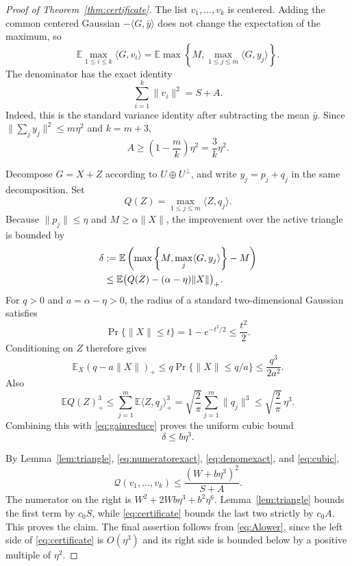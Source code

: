 \documentclass[11pt]{article}
\newcommand{\E}{\mathbb E}
\newcommand{\Q}{\mathcal Q}
\begin{document}
\begin{proof}[Proof of Theorem~\ref{thm:certificate}]
The list $v_1,\ldots,v_k$ is centered. Adding the common centered Gaussian
$-\langle G,\bar y\rangle$ does not change the expectation of the maximum,
so
\begin{equation}\label{eq:numeratorexact}
 \E\max_{1\le i\le k}\langle G,v_i\rangle
 =\E\max\left\{M,\max_{1\le j\le m}\langle G,y_j\rangle\right\}.
\end{equation}
The denominator has the exact identity
\begin{equation}\label{eq:denomexact}
 \sum_{i=1}^k\|v_i\|^2=S+A.
\end{equation}
Indeed, this is the standard variance identity after subtracting the mean
$\bar y$. Since $\|\sum_jy_j\|^2\le m\eta^2$ and $k=m+3$,
\begin{equation}\label{eq:Alower}
 A\ge\left(1-\frac{m}{k}\right)\eta^2=\frac3k\eta^2.
\end{equation}

Decompose $G=X+Z$ according to $U\oplus U^\perp$, and write
$y_j=p_j+q_j$ in the same decomposition. Set
\[
 Q(Z)=\max_{1\le j\le m}\langle Z,q_j\rangle.
\]
Because $\|p_j\|\le\eta$ and $M\ge\alpha\|X\|$, the improvement over the
active triangle is bounded by
\begin{align}
 \delta
 &:=\E\left(\max\left\{M,\max_j\langle G,y_j\rangle\right\}-M\right)
 \notag\\
 &\le\E\bigl(Q(Z)-(\alpha-\eta)\|X\|\bigr)_+.
 \label{eq:gainreduce}
\end{align}
For $q>0$ and $a=\alpha-\eta>0$, the radius of a standard
two-dimensional Gaussian satisfies
\[
 \Pr\{\|X\|\le t\}=1-e^{-t^2/2}\le\frac{t^2}{2}.
\]
Conditioning on $Z$ therefore gives
\[
 \E_X(q-a\|X\|)_+
 \le q\Pr\{\|X\|\le q/a\}
 \le\frac{q^3}{2a^2}.
\]
Also
\[
 \E Q(Z)_+^3
 \le\sum_{j=1}^m\E\langle Z,q_j\rangle_+^3
 =\sqrt{\frac2\pi}\sum_{j=1}^m\|q_j\|^3
 \le\sqrt{\frac2\pi}\,\eta^3.
\]
Combining this with \eqref{eq:gainreduce} proves the uniform cubic bound
\begin{equation}\label{eq:cubic}
 \delta\le b\eta^3.
\end{equation}

By Lemma~\ref{lem:triangle}, \eqref{eq:numeratorexact},
\eqref{eq:denomexact}, and \eqref{eq:cubic},
\[
 \Q(v_1,\ldots,v_k)
 \le\frac{(W+b\eta^3)^2}{S+A}.
\]
The numerator on the right is
$W^2+2Wb\eta^3+b^2\eta^6$.  Lemma~\ref{lem:triangle} bounds the first
term by $c_0S$, while \eqref{eq:certificate} bounds the last two strictly
by $c_0A$. This proves the claim. The final assertion follows from
\eqref{eq:Alower}, since the left side of \eqref{eq:certificate} is
$O(\eta^3)$ and its right side is bounded below by a positive multiple of
$\eta^2$.
\end{proof}
\end{document}
